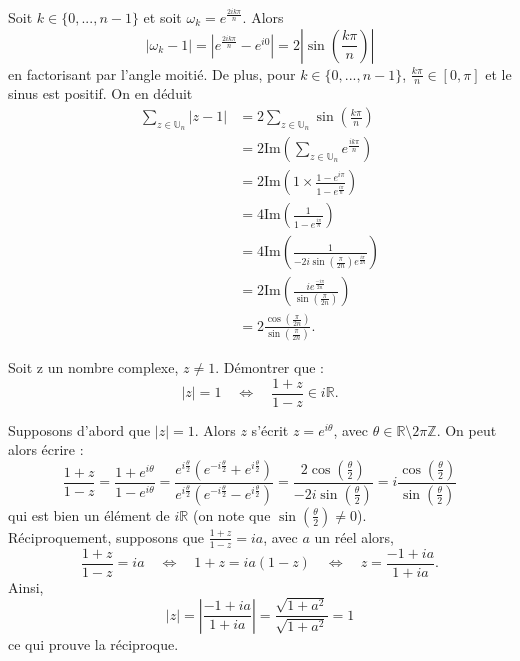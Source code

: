 \documentclass[a4paper, 11pt,openany]{book}%
\newtheorem[L]{thm}{Théorème}[section]
\newtheorem[M]{propo}[thm]{Proposition}
\newtheorem[M]{prop}[thm]{Propriété}
\newtheorem[M]{coro}[thm]{Corollaire}
\newtheorem[M]{lem}[thm]{Lemme}
\newtheorem[M,bodystyle=]{defi}[thm]{Définition}
\newtheorem[M,bodystyle=]{remark}[thm]{Remarque}
\newtheorem[M,bodystyle=]{met}[thm]{Méthode}
\newtheorem[M,bodystyle=]{ret}[thm]{A retenir}
\newtheorem[M,bodystyle=]{idee}[thm]{Idée}
\newtheorem[style=S,underline=false,bodystyle=]{exem}[thm]{Exemple}
\newtheorem[S,underline=false,bodystyle=]{exo}[thm]{Exercice}
\newtheorem[S,underline=false,bodystyle=]{appli}[thm]{Application}
\newtheorem[S,underline=false,bodystyle=]{sol}[thm]{Solution}
\newtheorem[S,underline=false,bodystyle=]{hypo}[thm]{Hypothesis}
\newtheorem[S,underline=false,bodystyle=]{nota}[thm]{Notation}
\begin{document}
\begin{sol}

Soit $k \in \{0,...,n-1\}$ et soit $\omega_k =e^{ \frac{2ik\pi}{n}}$. Alors 
\[ |\omega_k-1|=|e^{\frac{2ik\pi}{n}} - e^{i0}|=2 \left| \sin \left( \frac{k \pi}{n} \right) \right| \]
en factorisant par l'angle moitié. De plus, pour $k \in \{0,...,n-1\}$, $\frac{k \pi}{n} \in [0,\pi]$ et le sinus est positif. On en déduit
\begin{align*}
\sum_{z \in \mathbb{U}_n} |z-1| & =    2 \sum_{z \in \mathbb{U}_n} \sin \left( \frac{k \pi}{n} \right) \\ 
 &= 2 \text{Im} \left(  \sum_{z \in \mathbb{U}_n} e^{\frac{ik \pi}{n}}  \right)\\ 
 &= 2 \text{Im} \left( 1 \times \frac{1 - e^{i \pi}}{1 - e^{\frac{ i\pi}{n}}} \right)\\
  &= 4 \text{Im} \left( \frac{1}{1 - e^{\frac{ i\pi}{n}}}\right)\\ 
 &= 4 \text{Im} \left( \frac{1}{-2i \sin \left( \frac{\pi}{2n} \right) e^{\frac{ i\pi}{2n}}}\right)\\ 
  &= 2 \text{Im} \left( \frac{ie^{\frac{ -i\pi}{2n}}}{\sin \left( \frac{\pi}{2n} \right)}\right)\\ 
    &= 2 \frac{\cos \left( \frac{\pi}{2n} \right)}{\sin \left( \frac{\pi}{2n} \right)}.
\end{align*}

\end{sol}

\begin{exo}

Soit z un nombre complexe, $z \neq 1$. Démontrer que : 
\[ |z|=1 \quad \Leftrightarrow \quad \frac{1+z}{1-z} \in i \mathbb{R}.\]

\end{exo}


\begin{sol}

Supposons d'abord que $|z|=1$. Alors $z$ s'écrit $z=e^{i\theta}$, avec $ \theta \in \mathbb{R} \setminus 2 \pi \mathbb{Z}$. On peut alors écrire :
\[ \frac{1+z}{1-z}=\frac{1+e^{i \theta}}{1  - e^{i\theta}}=\frac{ e^{i \frac{\theta}{2}} \left( e^{-i \frac{\theta}{2}} + e^{i \frac{\theta}{2}} \right)}{e^{i \frac{\theta}{2}} \left( e^{-i \frac{\theta}{2}} - e^{i \frac{\theta}{2}} \right)} =
\frac{2\cos \left( \frac{\theta}{2} \right)}{-2i\sin \left( \frac{\theta}{2} \right)}
=i\frac{\cos \left( \frac{\theta}{2} \right)}{\sin \left( \frac{\theta}{2} \right)}\]
qui est bien un élément de $i\mathbb{R}$ (on note que $\sin \left( \frac{\theta}{2} \right) \neq 0$).\\
Réciproquement, supposons que $\frac{1+z}{1-z}=ia$, avec $a$ un réel alors,
\[ \frac{1+z}{1-z}=ia \quad \Leftrightarrow \quad 1+ z = ia(1-z) \quad \Leftrightarrow \quad z = \frac{-1 + ia}{1+ia}.\]
Ainsi,
\[ | z| = \left| \frac{-1 + ia}{1+ia} \right| = \frac{\sqrt{1+a^2}}{\sqrt{1+a^2}} = 1\]
ce qui prouve la réciproque.

\end{sol}
\end{document}
